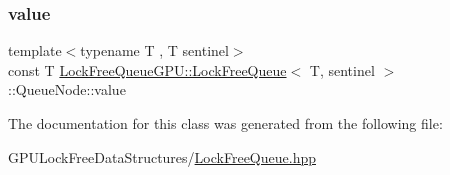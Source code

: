\subsubsection{\texorpdfstring{value}{value}}
{\footnotesize\ttfamily template$<$typename T , T sentinel$>$ \\
const T \mbox{\hyperlink{class_lock_free_queue_g_p_u_1_1_lock_free_queue}{Lock\+Free\+Queue\+G\+P\+U\+::\+Lock\+Free\+Queue}}$<$ T, sentinel $>$\+::Queue\+Node\+::value}



The documentation for this class was generated from the following file\+:\begin{DoxyCompactItemize}
\item 
G\+P\+U\+Lock\+Free\+Data\+Structures/\mbox{\hyperlink{_lock_free_queue_8hpp}{Lock\+Free\+Queue.\+hpp}}\end{DoxyCompactItemize}
